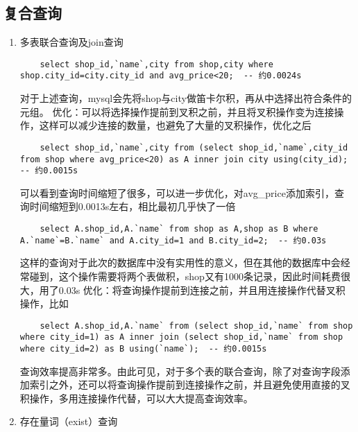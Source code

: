 \documentclass[a4paper, 11pt, nofonts, nocap, fancyhdr]{ctexart}
\begin{document}
\subsection{复合查询}

\begin{enumerate}

	\item 多表联合查询及join查询

	\begin{lstlisting}
	select shop_id,`name`,city from shop,city where shop.city_id=city.city_id and avg_price<20;  -- 约0.0024s
	\end{lstlisting}
对于上述查询，mysql会先将shop与city做笛卡尔积，再从中选择出符合条件的元组。
优化：可以将选择操作提前到叉积之前，并且将叉积操作变为连接操作，这样可以减少连接的数量，也避免了大量的叉积操作，优化之后
	\begin{lstlisting}
	select shop_id,`name`,city from (select shop_id,`name`,city_id from shop where avg_price<20) as A inner join city using(city_id);  -- 约0.0015s
	\end{lstlisting}
可以看到查询时间缩短了很多，可以进一步优化，对avg_price添加索引，查询时间缩短到0.0013s左右，相比最初几乎快了一倍

	\begin{lstlisting}
	select A.shop_id,A.`name` from shop as A,shop as B where A.`name`=B.`name` and A.city_id=1 and B.city_id=2;  -- 约0.03s
	\end{lstlisting}
这样的查询对于此次的数据库中没有实用性的意义，但在其他的数据库中会经常碰到，这个操作需要将两个表做积，shop又有1000条记录，因此时间耗费很大，用了0.03s
优化：将查询操作提前到连接之前，并且用连接操作代替叉积操作，比如
	\begin{lstlisting}
	select A.shop_id,A.`name` from (select shop_id,`name` from shop where city_id=1) as A inner join (select shop_id,`name` from shop where city_id=2) as B using(`name`);  -- 约0.0015s
	\end{lstlisting}
查询效率提高非常多。由此可见，对于多个表的联合查询，除了对查询字段添加索引之外，还可以将查询操作提前到连接操作之前，并且避免使用直接的叉积操作，多用连接操作代替，可以大大提高查询效率。\\

	\item 存在量词（exist）查询
	

\end{enumerate}
\end{document}
